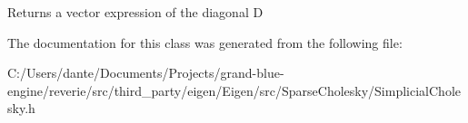 \begin{DoxyReturn}{Returns}
a vector expression of the diagonal D 
\end{DoxyReturn}


The documentation for this class was generated from the following file\+:\begin{DoxyCompactItemize}
\item 
C\+:/\+Users/dante/\+Documents/\+Projects/grand-\/blue-\/engine/reverie/src/third\+\_\+party/eigen/\+Eigen/src/\+Sparse\+Cholesky/Simplicial\+Cholesky.\+h\end{DoxyCompactItemize}
